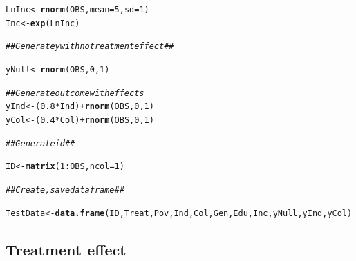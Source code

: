 \documentclass[11pt, a4paper]{article}\usepackage[]{graphicx}\usepackage[]{color}
\makeatletter
\newcommand{\hlnum}[1]{\textcolor[rgb]{0.686,0.059,0.569}{#1}}%
\newcommand{\hlcom}[1]{\textcolor[rgb]{0.678,0.584,0.686}{\textit{#1}}}%
\newcommand{\hlopt}[1]{\textcolor[rgb]{0,0,0}{#1}}%
\newcommand{\hlstd}[1]{\textcolor[rgb]{0.345,0.345,0.345}{#1}}%
\newcommand{\hlkwb}[1]{\textcolor[rgb]{0.69,0.353,0.396}{#1}}%
\newcommand{\hlkwc}[1]{\textcolor[rgb]{0.333,0.667,0.333}{#1}}%
\newcommand{\hlkwd}[1]{\textcolor[rgb]{0.737,0.353,0.396}{\textbf{#1}}}%
\newenvironment{kframe}{%
 \def\at@end@of@kframe{}%
 \ifinner\ifhmode%
  \def\at@end@of@kframe{\end{minipage}}%
  \begin{minipage}{\columnwidth}%
 \fi\fi%
 \def\FrameCommand##1{\hskip\@totalleftmargin \hskip-\fboxsep
 \colorbox{shadecolor}{##1}\hskip-\fboxsep
     \hskip-\linewidth \hskip-\@totalleftmargin \hskip\columnwidth}%
 \MakeFramed {\advance\hsize-\width
   \@totalleftmargin\z@ \linewidth\hsize
   \@setminipage}}%
 {\par\unskip\endMakeFramed%
 \at@end@of@kframe}
\newenvironment{knitrout}{}{} %
\makeatother
\begin{document}
\begin{knitrout}
\begin{kframe}
\begin{alltt}
     \hlstd{LnInc} \hlkwb{<-} \hlkwd{rnorm}\hlstd{(OBS,} \hlkwc{mean} \hlstd{=} \hlnum{5}\hlstd{,} \hlkwc{sd} \hlstd{=} \hlnum{1}\hlstd{)}
     \hlstd{Inc} \hlkwb{<-} \hlkwd{exp}\hlstd{(LnInc)}

    \hlcom{## Generate y with notreatment effect ##}

      \hlstd{yNull} \hlkwb{<-} \hlkwd{rnorm}\hlstd{(OBS,} \hlnum{0}\hlstd{,} \hlnum{1}\hlstd{)}

    \hlcom{## Generate outcome with effects}
      \hlstd{yInd} \hlkwb{<-} \hlstd{(}\hlnum{0.8} \hlopt{*} \hlstd{Ind)} \hlopt{+} \hlkwd{rnorm}\hlstd{(OBS,} \hlnum{0}\hlstd{,} \hlnum{1}\hlstd{)}
      \hlstd{yCol} \hlkwb{<-} \hlstd{(}\hlnum{0.4} \hlopt{*} \hlstd{Col)} \hlopt{+} \hlkwd{rnorm}\hlstd{(OBS,} \hlnum{0}\hlstd{,} \hlnum{1}\hlstd{)}

    \hlcom{## Generate id ##}

      \hlstd{ID} \hlkwb{<-} \hlkwd{matrix}\hlstd{(}\hlnum{1}\hlopt{:}\hlstd{OBS,} \hlkwc{ncol} \hlstd{=} \hlnum{1}\hlstd{)}

    \hlcom{## Create, save dataframe ##}

      \hlstd{TestData} \hlkwb{<-} \hlkwd{data.frame}\hlstd{(ID, Treat, Pov, Ind, Col, Gen, Edu, Inc, yNull, yInd, yCol)}
\end{alltt}
\end{kframe}
\end{knitrout}

    \subsection{Treatment effect}
\end{document}
